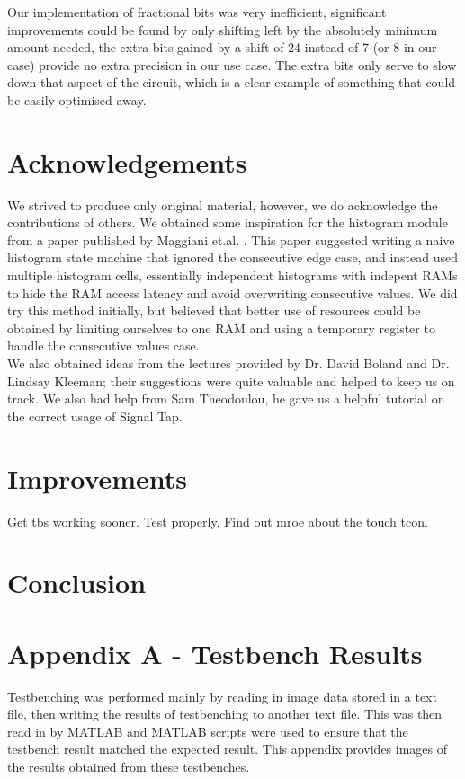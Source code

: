 \documentclass[12pt]{article}
\begin{document}
  Our implementation of fractional bits was very inefficient, significant improvements could be found by only shifting left by the absolutely minimum amount needed, the extra bits gained by a shift of 24 instead of 7 (or 8 in our case) provide no extra precision in our use case. The extra bits only serve to slow down that aspect of the circuit, which is a clear example of something that could be easily optimised away.
  
  \section{Acknowledgements}
  We strived to produce only original material, however, we do acknowledge the contributions of others. We obtained some inspiration for the histogram module from a paper published by Maggiani et.al. \cite{histogram}. This paper suggested writing a naive histogram state machine that ignored the consecutive edge case, and instead used multiple histogram cells, essentially independent histograms with indepent RAMs to hide the RAM access latency and avoid overwriting consecutive values. We did try this method initially, but believed that better use of resources could be obtained by limiting ourselves to one RAM and using a temporary register to handle the consecutive values case. \\
  
  We also obtained ideas from the lectures provided by Dr. David Boland and Dr. Lindsay Kleeman; their suggestions were quite valuable and helped to keep us on track. We also had help from Sam Theodoulou, he gave us a helpful tutorial on the correct usage of Signal Tap.
  
  \section{Improvements}
  Get tbs working sooner. Test properly. Find out mroe about the touch tcon. 
  
  \section{Conclusion}
  
  
  
  \newpage
  \section{Appendix A - Testbench Results}
  Testbenching was performed mainly by reading in image data stored in a text file, then writing the results of testbenching to another text file. This was then read in by MATLAB and MATLAB scripts were used to ensure that the testbench result matched the expected result. This appendix provides images of the results obtained from these testbenches.
\end{document}
